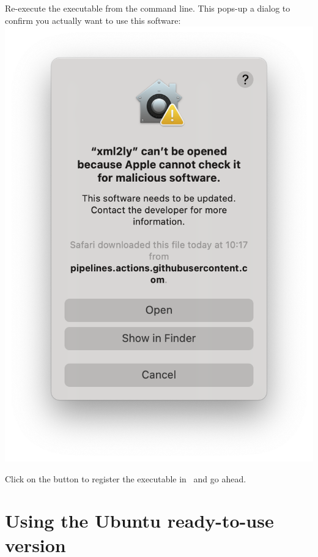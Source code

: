 Re-execute the executable from the command line. This pops-up a dialog to confirm you actually want to use this software:\\
\includegraphics[scale=0.35]{../mfgraphics/mfgraphicsMacOSConfirmOpening.png}

Click on the  button to register the executable in \Gatekeeper\ and go ahead.


\section{Using the Ubuntu ready-to-use version}

